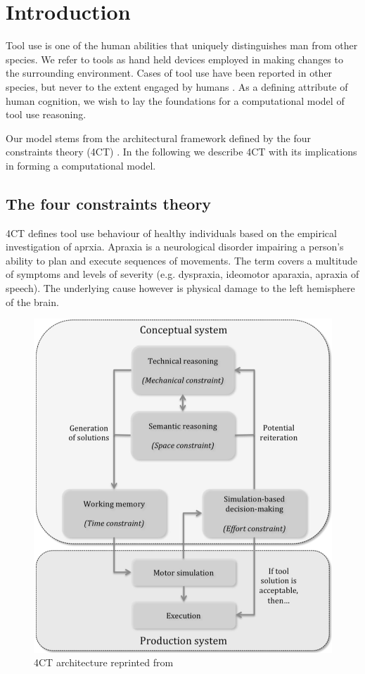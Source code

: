 \documentclass[11]{article}
\begin{document}
\section{Introduction}
Tool use is one of the human abilities that uniquely distinguishes man from other species. 
We refer to tools as hand held devices employed in making changes to the surrounding environment. 
Cases of tool use have been reported in other species, but never to the extent engaged by humans \cite{boysen1999,harrington2009,lefebvre2004}. 
As a defining attribute of human cognition, we wish to lay the foundations for a computational model of tool use reasoning.

Our model stems from the architectural framework defined by the four constraints theory (4CT) \cite{osiurak2014a}.
In the following we describe 4CT with its implications in forming a computational model.  

\subsection{The four constraints theory}
4CT defines tool use behaviour of healthy individuals based on the empirical investigation of aprxia.
Apraxia is a neurological disorder impairing a person's ability to plan and execute sequences of movements.
The term covers a multitude of symptoms and levels of severity (e.g. dyspraxia, ideomotor aparaxia, apraxia of speech).
The underlying cause however is physical damage to the left hemisphere of the brain\cite{osiurak2013}.

\begin{figure}[h]
  \centering
  \includegraphics[width=.9\textwidth]{./figures/4CTArchitecture.png}
  \caption{4CT architecture reprinted from \cite{osiurak2014a}}
  \label{fig:4CTArchitecture}
\end{figure}      
\end{document}
